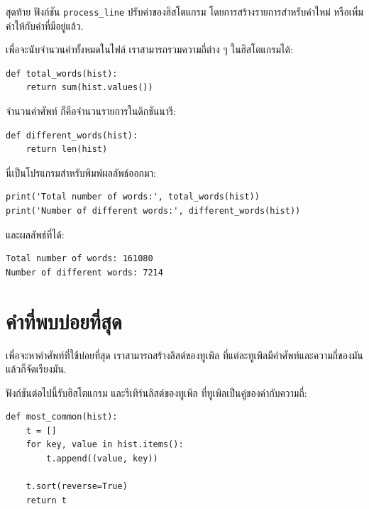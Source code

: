 สุดท้าย ฟังก์ชัน \verb|process_line| ปรับค่าของฮิสโตแกรม
โดยการสร้างรายการสำหรับคำใหม่ หรือเพิ่มค่าให้กับคำที่มีอยู่แล้ว.


เพื่อจะนับจำนวนคำทั้งหมดในไฟล์
เราสามารถรวมความถี่ต่าง ๆ ในฮิสโตแกรมได้:

\begin{verbatim}
def total_words(hist):
    return sum(hist.values())
\end{verbatim}
%
%
จำนวนคำศัพท์ ก็คือจำนวนรายการในดิกชันนารี:

\begin{verbatim}
def different_words(hist):
    return len(hist)
\end{verbatim}
%
%
นี่เป็นโปรแกรมสำหรับพิมพ์ผลลัพธ์ออกมา:

\begin{verbatim}
print('Total number of words:', total_words(hist))
print('Number of different words:', different_words(hist))
\end{verbatim}
%
%
และผลลัพธ์ที่ได้:

\begin{verbatim}
Total number of words: 161080
Number of different words: 7214
\end{verbatim}
%

\section{คำที่พบบ่อยที่สุด}


เพื่อจะหาคำศัพท์ที่ใช้บ่อยที่สุด
เราสามารถสร้างลิสต์ของทูเพิล ที่แต่ละทูเพิลมีคำศัพท์และความถี่ของมัน
แล้วก็จัดเรียงมัน.


ฟังก์ชันต่อไปนี้รับฮิสโตแกรม และรีเทิร์นลิสต์ของทูเพิล ที่ทูเพิลเป็นคู่ของคำกับความถี่:

\begin{verbatim}
def most_common(hist):
    t = []
    for key, value in hist.items():
        t.append((value, key))

    t.sort(reverse=True)
    return t
\end{verbatim}


